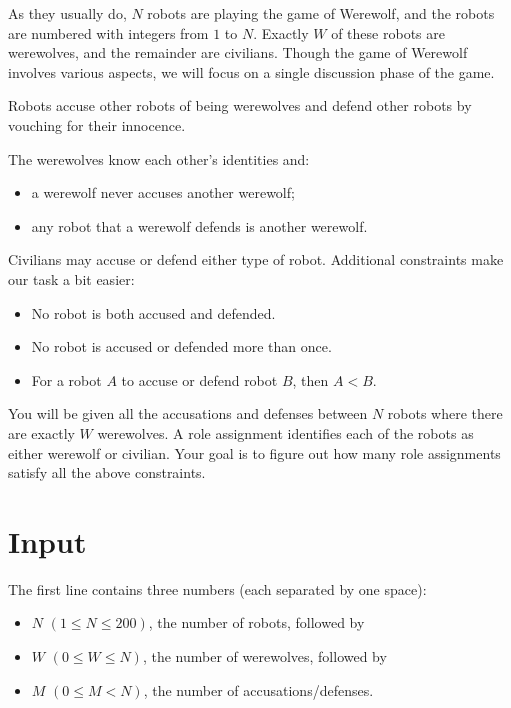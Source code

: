 As they usually do, $N$ robots are playing the game of Werewolf, and the robots are numbered with integers from $1$ to $N$. Exactly $W$ of these robots are werewolves, and the remainder are civilians. Though the game of Werewolf involves various aspects, we will focus on a single discussion phase of the game.

Robots accuse other robots of being werewolves and defend other robots by vouching for their innocence.

The werewolves know each other's identities and:

\begin{itemize}
\item a werewolf never accuses another werewolf;
\item any robot that a werewolf defends is another werewolf.
\end{itemize}

Civilians may accuse or defend either type of robot.
Additional constraints make our task a bit easier:

\begin{itemize}
\item No robot is both accused and defended.
\item No robot is accused or defended more than once.
\item For a robot $A$ to accuse or defend robot $B$, then $A < B$.
\end{itemize}

You will be given all the accusations and defenses between $N$ robots where there are exactly $W$ werewolves. A role assignment identifies each of the robots as either werewolf or civilian. Your goal is to figure out how many role assignments satisfy all the above constraints.

\section*{Input}
The first line contains three numbers (each separated by one space):

\begin{itemize}
\item $N$ $(1 \leq N \leq 200)$, the number of robots, followed by
\item $W$ $(0 \leq W \leq N)$, the number of werewolves, followed by
\item $M$ $(0 \leq M < N)$, the number of accusations/defenses.
\end{itemize}

